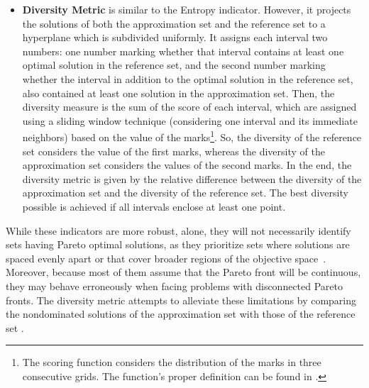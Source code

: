 \begin{itemize}
		\item \textbf{Diversity Metric} is similar to the Entropy indicator. However, it projects the solutions of both the approximation set and the reference set to a hyperplane which is subdivided uniformly. It assigns each interval two numbers: one number marking whether that interval contains at least one optimal solution in the reference set, and the second number marking whether the interval in addition to the optimal solution in the reference set, also contained at least one solution in the approximation set. Then, the diversity measure is the sum of the score of each interval, which are assigned using a sliding window technique (considering one interval and its immediate neighbors) based on the value of the marks\footnote{The scoring function considers the distribution of the marks in three consecutive grids. The function's proper definition can be found in \cite{Deb2002DM}.}. So, the diversity of the reference set considers the value of the first marks, whereas the diversity of the approximation set considers the values of the second marks. In the end, the diversity metric is given by the relative difference between the diversity of the approximation set and the diversity of the reference set. The best diversity possible is achieved if all intervals enclose at least one point\cite{Deb2002DM}.
		
	\end{itemize}
	
	While these indicators are more robust, alone, they will not necessarily identify sets having Pareto optimal solutions, as they prioritize sets where solutions are spaced evenly apart or that cover broader regions of the objective space~\cite{Veldhuizen1999GD}. Moreover, because most of them assume that the Pareto front will be continuous, they may behave erroneously when facing problems with disconnected Pareto fronts. The diversity metric attempts to alleviate these limitations by comparing the nondominated solutions of the approximation set with those of the reference set \cite{Deb2002DM}.
	
